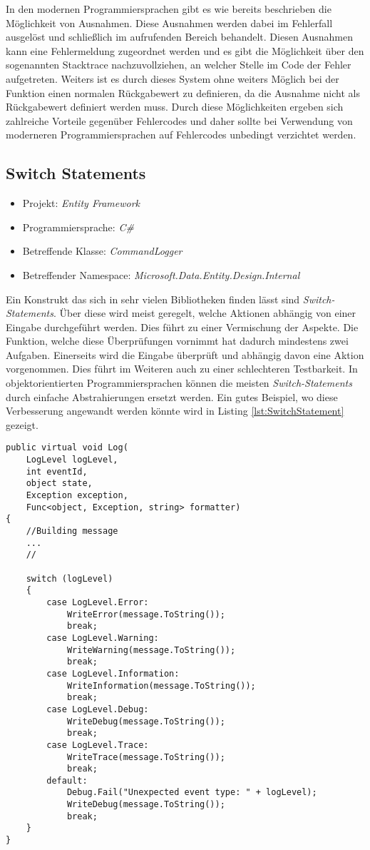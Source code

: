\SuperPar In den modernen Programmiersprachen gibt es wie bereits beschrieben die Möglichkeit von Ausnahmen. Diese Ausnahmen werden dabei im Fehlerfall ausgelöst und schließlich im aufrufenden Bereich behandelt. Diesen Ausnahmen kann eine Fehlermeldung zugeordnet werden und es gibt die Möglichkeit über den sogenannten Stacktrace nachzuvollziehen, an welcher Stelle im Code der Fehler aufgetreten. Weiters ist es durch dieses System ohne weiters Möglich bei der Funktion einen normalen Rückgabewert zu definieren, da die Ausnahme nicht als Rückgabewert definiert werden muss. Durch diese Möglichkeiten ergeben sich zahlreiche Vorteile gegenüber Fehlercodes und daher sollte bei Verwendung von moderneren Programmiersprachen auf Fehlercodes unbedingt verzichtet werden.

\subsection{Switch Statements}
\begin{itemize}
	\item Projekt: \textit{Entity Framework}
	\item Programmiersprache: \textit{C\#}
	\item Betreffende Klasse: \textit{CommandLogger }
	\item Betreffender Namespace: \textit{Microsoft.Data.Entity.Design.Internal}
\end{itemize}

\SuperPar Ein Konstrukt das sich in sehr vielen Bibliotheken finden lässt sind \textit{Switch-Statements}. Über diese wird meist geregelt, welche Aktionen abhängig von einer Eingabe durchgeführt werden. Dies führt zu einer Vermischung der Aspekte. Die Funktion, welche diese Überprüfungen vornimmt hat dadurch mindestens zwei Aufgaben. Einerseits wird die Eingabe überprüft und abhängig davon eine Aktion vorgenommen. Dies führt im Weiteren auch zu einer schlechteren Testbarkeit. In objektorientierten Programmiersprachen können die meisten \textit{Switch-Statements} durch einfache Abstrahierungen ersetzt werden. Ein gutes Beispiel, wo diese Verbesserung angewandt werden könnte wird in Listing \ref{lst:SwitchStatement} gezeigt.

\begin{lstlisting}[language={[Sharp]C}, caption=Beispiele für Switch Statement; label=lst:SwitchStatement]
public virtual void Log(
	LogLevel logLevel,
	int eventId,
	object state,
	Exception exception,
	Func<object, Exception, string> formatter)
{
	//Building message
	...
	//

	switch (logLevel)
	{
		case LogLevel.Error:
			WriteError(message.ToString());
			break;
		case LogLevel.Warning:
			WriteWarning(message.ToString());
			break;
		case LogLevel.Information:
			WriteInformation(message.ToString());
			break;
		case LogLevel.Debug:
			WriteDebug(message.ToString());
			break;
		case LogLevel.Trace:
			WriteTrace(message.ToString());
			break;
		default:
			Debug.Fail("Unexpected event type: " + logLevel);
			WriteDebug(message.ToString());
			break;
	}
}
\end{lstlisting}

